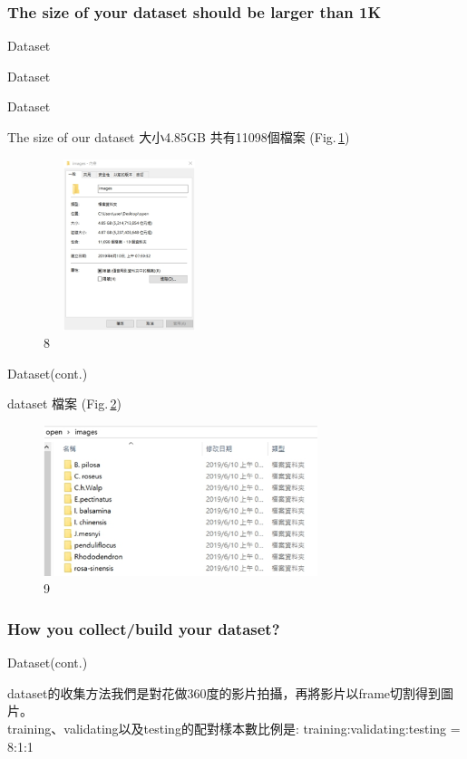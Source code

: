 \documentclass{beamer}
\begin{document}
\subsubsection{The size of your dataset should be larger than 1K}

\begin{frame}{Dataset}

\center \huge Dataset
\end{frame}

\begin{frame}{Dataset}
  \begin{CJK}{UTF8}{bkai}
The size of our dataset  大小4.85GB 共有11098個檔案 (Fig.\,\ref{fig:8})
   \end{CJK}
 \begin{figure}
    \includegraphics[width=5cm,height=5cm]{dataset(1).png}
    \caption{8}
    \label{fig:8}
  \end{figure}

\end{frame}


\begin{frame}{Dataset(cont.)}
 \begin{CJK}{UTF8}{bkai}
dataset 檔案 (Fig.\,\ref{fig:9})
 \begin{figure}
    \includegraphics[width=8cm]{dataset(2).png}
    \caption{9}
    \label{fig:9}
  \end{figure}
  \end{CJK}
\end{frame}

\subsubsection{How you collect/build your dataset?}
\begin{frame}{Dataset(cont.)}
  \begin{CJK}{UTF8}{bkai}
	dataset的收集方法我們是對花做360度的影片拍攝，再將影片以frame切割得到圖片。\\
           \bigskip
   	training、validating以及testing的配對樣本數比例是:
	training:validating:testing = 8:1:1
   \end{CJK}
\end{frame}
\end{document}
